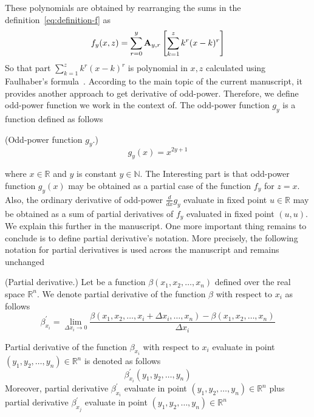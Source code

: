 These polynomials are obtained by rearranging the sums in the definition~\eqref{eq:definition-f} as
\[
    f_{y} (x, z) = \sum_{r=0}^{y} {\mathbf{A}} \sb{y,r} \left[ \sum_{k=1}^{z} k^r (x-k)^r \right]
\]
So that part $\sum_{k=1}^{z} k^r (x-k)^r$ is polynomial
in $x, z$ calculated using Faulhaber's formula~\cite{beardon1996sums}.
According to the main topic of the current manuscript, it provides another approach to get derivative of odd-power.
Therefore, we define odd-power function we work in the context of.
The odd-power function $g_y$ is a function defined as follows
\begin{definition}(Odd-power function $g_y$.)
    \begin{equation*}
        g_{y}(x) = x^{2y + 1}
    \end{equation*}
\end{definition}
where $x\in \mathbb{R}$ and $y$ is constant $y\in \mathbb{N}$.
The Interesting part is that odd-power function $g_{y} (x)$ may be obtained
as a partial case of the function $f_y$ for $z=x$.
Also, the ordinary derivative of odd-power $\frac{d}{dx} g_{y}$ evaluate in fixed point $u\in\mathbb{R}$
may be obtained as a sum of partial derivatives of $f_y$ evaluated in fixed point $(u,u)$.
We explain this further in the manuscript.
One more important thing remains to conclude is to define partial derivative's notation.
More precisely, the following notation for partial derivatives
is used across the manuscript and remains unchanged
\begin{notation} (Partial derivative.)
    Let be a function $\beta (x_1, x_2, \dots, x_n)$ defined over the real space $\mathbb{R}^n$.
    We denote partial derivative of the function $\beta$ with respect to $x_i$ as follows
    \begin{equation*}
        \beta^{'}_{x_i}
        = \lim_{\Delta x_i \to 0}
        \frac{\beta (x_1, x_2, \dots, x_i + \Delta x_i, \dots, x_n) - \beta (x_1, x_2, \dots, x_n)}{\Delta x_i}
    \end{equation*}
\end{notation}
Partial derivative of the function $\beta_{x_i}$ with respect to $x_i$
evaluate in point $(y_1, y_2, \dots, y_n) \in \mathbb{R}^n$ is denoted as follows
\begin{equation*}
    \beta^{'}_{x_i} (y_1, y_2, \dots, y_n)
\end{equation*}
Moreover, partial derivative $\beta^{'}_{x_i}$ evaluate in point $(y_1, y_2, \dots, y_n) \in \mathbb{R}^n$ plus
partial derivative $\beta^{'}_{x_j}$ evaluate in point $(y_1, y_2, \dots, y_n) \in \mathbb{R}^n$
